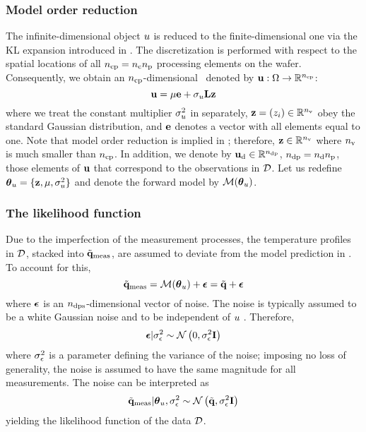 \subsubsection{Model order reduction} 
The infinite-dimensional object $u$ is reduced to the finite-dimensional one via the KL expansion introduced in . The discretization is performed with respect to the spatial locations of all ${n_\text{cp}} = {n_{\text{c}}} {n_\text{p}}$ processing elements on the wafer. Consequently, we obtain an ${n_\text{cp}}$-dimensional \rv\ denoted by $\mathbf{u}: \Omega \to \mathbb{R}^{n_\text{cp}}$:
\begin{equation} \elabel{kl-approximation}
  \vu = \mu \vI + \sigma_\u \mKL \vz
\end{equation}
where we treat the constant multiplier $\sigma^2_u$ in  separately, $\mathbf{z} = (z_i) \in \mathbb{R}^{n_\text{v}}$ obey the standard Gaussian distribution, and $\mathbf{e}$ denotes a vector with all elements equal to one. Note that model order reduction is implied in ; therefore, $\mathbf{z} \in \mathbb{R}^{n_\text{v}}$ where ${n_\text{v}}$ is much smaller than ${n_\text{cp}}$. In addition, we denote by $\mathbf{u}_{\text{d}} \in \mathbb{R}^{{n_\text{dp}}}$, ${n_\text{dp}} = {n_{\text{d}}} {n_\text{p}}$, those elements of $\mathbf{u}$ that correspond to the observations in $\mathcal{D}$. Let us redefine ${\boldsymbol\theta}_u = \{ \mathbf{z}, \mu, \sigma^2_u \}$ and denote the forward model by $\model{\vparam_\u}$.

\subsubsection{The likelihood function}
Due to the imperfection of the measurement processes, the temperature profiles in $\mathcal{D}$, stacked into $\tilde{\mathbf{q}}_{\text{meas}}$, are assumed to deviate from the model prediction in . To account for this,
\[
  \mvT_\meas = \model{\vparam_\u} + \vnoise = \mvT + \vnoise
\]
where $\boldsymbol\epsilon$ is an ${n_\text{dps}}$-dimensional vector of noise. The noise is typically assumed to be a white Gaussian noise and to be independent of $u$ \cite{rasmussen2006, marzouk2009}. Therefore,
\[
  \boldsymbol\epsilon | \sigma^2_\epsilon \sim \mathcal{N}\left( 0, \sigma^2_\epsilon \mathbf{I} \right)
\]
where $\sigma^2_\epsilon$ is a parameter defining the variance of the noise; imposing no loss of generality, the noise is assumed to have the same magnitude for all measurements. The noise can be interpreted as
\begin{equation} \elabel{likelihood}
  \mvT_\meas | \vparam_\u, \sigma_\noise^2 \sim \gaussian{\mvT}{\sigma_\noise^2 \mI}
\end{equation}
yielding the likelihood function of the data $\mathcal{D}$.

